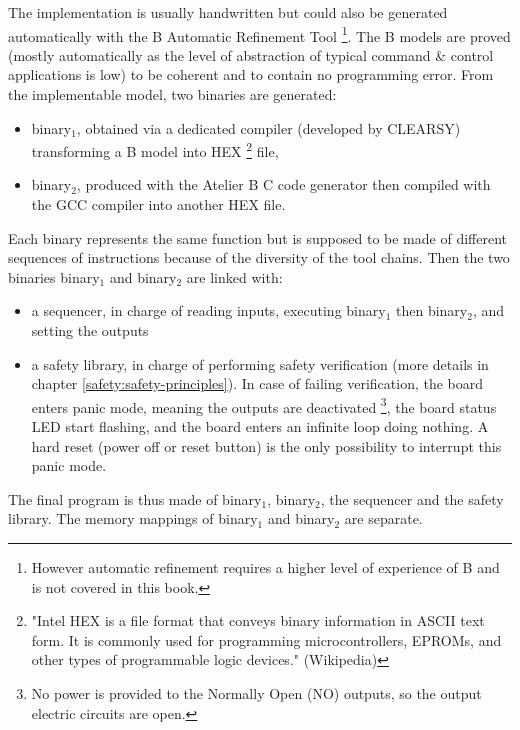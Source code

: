 The implementation is usually handwritten but could also be generated automatically with the B Automatic Refinement Tool \footnote{However automatic refinement requires a higher level of experience of B and is not covered in this book.}. The B models are proved (mostly automatically as the level of abstraction of typical command \& control applications is low) to be coherent and to contain no programming error.
From the implementable model, two binaries are generated:
\begin{itemize}
    \item binary$_1$, obtained via a dedicated compiler (developed by CLEARSY) transforming a B model into HEX \footnote{"Intel HEX is a file format that conveys binary information in ASCII text form. It is commonly used for programming microcontrollers, EPROMs, and other types of programmable logic devices." (Wikipedia)} file,
    \item binary$_2$, produced with the Atelier B C code generator then compiled with the GCC compiler into another HEX file.
\end{itemize} 
Each binary represents the same function but is supposed to be made of different sequences of instructions because of the diversity of the tool chains. 
Then the two binaries binary$_1$ and binary$_2$ are linked with:
\begin{itemize}
    \item a sequencer, in charge of reading inputs, executing binary$_1$ then binary$_2$, and setting the outputs
    \item a safety library, in charge of performing safety verification (more details in chapter \ref{safety:safety-principles}). In case of failing verification, the board enters panic mode, meaning the outputs are deactivated \footnote{No power is provided to the Normally Open (NO) outputs, so the output electric circuits are open.}, the board status LED start flashing, and the board enters an infinite loop doing nothing. A hard reset (power off or reset button) is the only possibility to interrupt this panic mode.
\end{itemize}
The final program is thus made of binary$_1$, binary$_2$, the sequencer and the safety library. The memory mappings of binary$_1$ and binary$_2$ are separate. 

